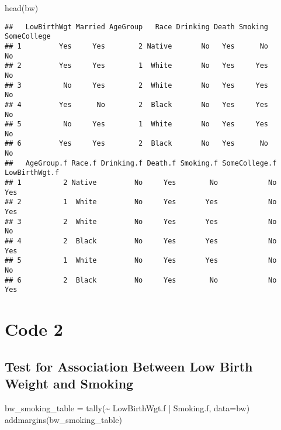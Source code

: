 \documentclass[
]{article}
\newenvironment{Shaded}{\begin{snugshade}}{\end{snugshade}}
\newcommand{\AttributeTok}[1]{\textcolor[rgb]{0.77,0.63,0.00}{#1}}
\newcommand{\FunctionTok}[1]{\textcolor[rgb]{0.00,0.00,0.00}{#1}}
\newcommand{\NormalTok}[1]{#1}
\newcommand{\OtherTok}[1]{\textcolor[rgb]{0.56,0.35,0.01}{#1}}
\newcommand{\SpecialCharTok}[1]{\textcolor[rgb]{0.00,0.00,0.00}{#1}}
\begin{document}
\begin{Shaded}
\begin{Highlighting}[]
\FunctionTok{head}\NormalTok{(bw)}
\end{Highlighting}
\end{Shaded}

\begin{verbatim}
##   LowBirthWgt Married AgeGroup   Race Drinking Death Smoking SomeCollege
## 1         Yes     Yes        2 Native       No   Yes      No          No
## 2         Yes     Yes        1  White       No   Yes     Yes          No
## 3          No     Yes        2  White       No   Yes     Yes          No
## 4         Yes      No        2  Black       No   Yes     Yes          No
## 5          No     Yes        1  White       No   Yes     Yes          No
## 6         Yes     Yes        2  Black       No   Yes      No          No
##   AgeGroup.f Race.f Drinking.f Death.f Smoking.f SomeCollege.f LowBirthWgt.f
## 1          2 Native         No     Yes        No            No           Yes
## 2          1  White         No     Yes       Yes            No           Yes
## 3          2  White         No     Yes       Yes            No            No
## 4          2  Black         No     Yes       Yes            No           Yes
## 5          1  White         No     Yes       Yes            No            No
## 6          2  Black         No     Yes        No            No           Yes
\end{verbatim}

\hypertarget{code-2}{%
\section{Code 2}\label{code-2}}

\hypertarget{test-for-association-between-low-birth-weight-and-smoking}{%
\subsection{Test for Association Between Low Birth Weight and
Smoking}\label{test-for-association-between-low-birth-weight-and-smoking}}

\begin{Shaded}
\begin{Highlighting}[]
\NormalTok{bw\_smoking\_table }\OtherTok{=} \FunctionTok{tally}\NormalTok{(}\SpecialCharTok{\textasciitilde{}}\NormalTok{ LowBirthWgt.f }\SpecialCharTok{|}\NormalTok{ Smoking.f, }\AttributeTok{data=}\NormalTok{bw)}
\FunctionTok{addmargins}\NormalTok{(bw\_smoking\_table)}
\end{Highlighting}
\end{Shaded}
\end{document}
